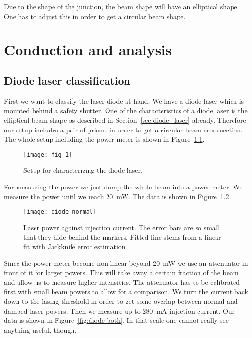 \documentclass[11pt, english, fleqn, DIV=15, headinclude, BCOR=2cm]{scrreprt}
\begin{document}
Due to the shape of the junction, the beam shape will have an elliptical shape.
One has to adjust this in order to get a circular beam shape.

\chapter{Conduction and analysis}

\section{Diode laser classification}

First we want to classify the laser diode at hand. We have a diode laser which
is mounted behind a safety shutter. One of the characteristics of a diode laser
is the elliptical beam shape as described in Section~\ref{sec:diode_laser}
already. Therefore our setup includes a pair of prisms in order to get a
circular beam cross section. The whole setup including the power meter is shown
in Figure~\ref{fig:fig-1}.

\begin{figure}
    \centering
    \texttt{[image: fig-1]}
    \caption{%
        Setup for characterizing the diode laser.
        \parencite[Figure~1]{lab-course/doubling/manual}
    }
    \label{fig:fig-1}
\end{figure}

For measuring the power we just dump the whole beam into a power meter. We
measure the power until we reach \SI{20}{\milli\watt}. 
The data is shown in Figure~\ref{fig:diode-normal}.

\begin{figure}
    \centering
    \texttt{[image: diode-normal]}
    \caption{%
        Laser power against injection current. The error bars are so small that
        they hide behind the markers. Fitted line stems from a linear fit with
        Jackknife error estimation.
    }
    \label{fig:diode-normal}
\end{figure}

Since the power meter become non-linear beyond \SI{20}{\milli\watt} we use an
attenuator in front of it for larger powers. This will take away a certain
fraction of the beam and allow us to measure higher intensities. The attenuator
has to be calibrated first with small beam powers to allow for a comparison. We
turn the current back down to the lasing threshold in order to get some overlap
between normal and damped laser powers. Then we measure up to
\SI{280}{\milli\ampere} injection current. Our data is shown in
Figure~\ref{fig:diode-both}. In that scale one cannot really see anything
useful, though.
\end{document}
